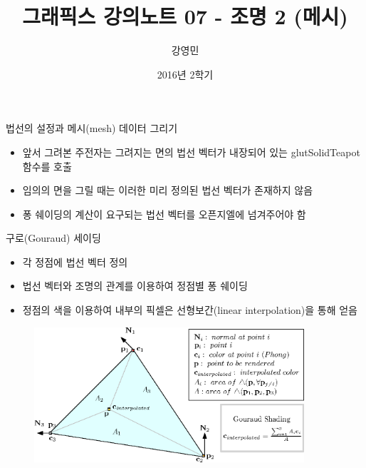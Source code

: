 \documentclass{beamer}
\title[3D 그래픽스 프로그래밍]{그래픽스 강의노트 07 - 조명 2 (메시)}
\author{강영민}
\institute{동명대학교}
\date{2016년 2학기}
\begin{document}
\begin{frame}
  \titlepage
\end{frame}





\begin{frame}[fragile]{법선의 설정과 메시(mesh) 데이터 그리기}

\begin{itemize}
\item 앞서 그려본 주전자는 그려지는 면의 법선 벡터가 내장되어 있는 {\sf glutSolidTeapot} 함수를 호출
\item 임의의 면을 그릴 때는 이러한 미리 정의된 법선 벡터가 존재하지 않음
\item 퐁 쉐이딩의 계산이 요구되는 법선 벡터를 오픈지엘에 넘겨주어야 함
\end{itemize}

\end{frame}



\begin{frame}[fragile]{구로(Gouraud) 세이딩}

\begin{itemize}
\item 각 정점에 법선 벡터 정의
\item 법선 벡터와 조명의 관계를 이용하여 정점별 퐁 쉐이딩
\item 정점의 색을 이용하여 내부의 픽셀은 선형보간(linear interpolation)을 통해 얻음
\end{itemize}

\begin{figure}[h!]
  \centering
    \includegraphics[height=5cm]{OGL_light/interpolatedColors.eps}
\end{figure}
\end{frame}
\end{document}
